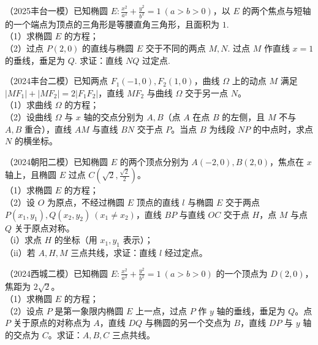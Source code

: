\begin{exercise} %
（2025丰台一模）已知椭圆 $E:\frac{x^2}{a^2}+\frac{y^2}{b^2}=1\ (a>b>0)$，以 $E$ 的两个焦点与短轴的一个端点为顶点的三角形是等腰直角三角形，且面积为 $1$.\\
（1）求椭圆 $E$ 的方程；\\
（2）过点 $P(2,0)$ 的直线与椭圆 $E$ 交于不同的两点 $M,N$. 过点 $M$ 作直线 $x=1$ 的垂线，垂足为 $Q$. 求证：直线 $NQ$ 过定点.
\end{exercise}

\begin{exercise} %
（2024丰台二模）已知两点 $F_1(-1,0),F_2(1,0)$，曲线 $\Omega$ 上的动点 $M$ 满足 $\lvert MF_1\rvert+\lvert MF_2\rvert=2\lvert F_1F_2\rvert$，直线 $MF_2$ 与曲线 $\Omega$ 交于另一点 $N$。\\
（1）求曲线 $\Omega$ 的方程；\\
（2）设曲线 $\Omega$ 与 $x$ 轴的交点分别为 $A,B$（点 $A$ 在点 $B$ 的左侧，且 $M$ 不与 $A,B$ 重合），直线 $AM$ 与直线 $BN$ 交于点 $P$。当点 $B$ 为线段 $NP$ 的中点时，求点 $N$ 的横坐标。
\end{exercise}

\begin{exercise} %
（2024朝阳二模）已知椭圆 $E$ 的两个顶点分别为 $A(-2,0),B(2,0)$，焦点在 $x$ 轴上，且椭圆 $E$ 过点 $C\left(\sqrt{2},\frac{\sqrt{2}}{2}\right)$。\\
（1）求椭圆 $E$ 的方程；\\
（2）设 $O$ 为原点，不经过椭圆 $E$ 顶点的直线 $l$ 与椭圆 $E$ 交于两点 $P(x_1,y_1),Q(x_2,y_2)\ (x_1\neq x_2)$，直线 $BP$ 与直线 $OC$ 交于点 $H$，点 $M$ 与点 $Q$ 关于原点对称。\\
（i）求点 $H$ 的坐标（用 $x_1,y_1$ 表示）；\\
（ii）若 $A,H,M$ 三点共线，求证：直线 $l$ 经过定点。
\end{exercise}

\begin{exercise} %
（2024西城二模）已知椭圆 $E:\frac{x^2}{a^2}+\frac{y^2}{b^2}=1\ (a>b>0)$ 的一个顶点为 $D(2,0)$，焦距为 $2\sqrt{2}$。\\
（1）求椭圆 $E$ 的方程；\\
（2）设点 $P$ 是第一象限内椭圆 $E$ 上一点，过点 $P$ 作 $y$ 轴的垂线，垂足为 $Q$。点 $P$ 关于原点的对称点为 $A$，直线 $DQ$ 与椭圆的另一个交点为 $B$，直线 $DP$ 与 $y$ 轴的交点为 $C$。求证：$A,B,C$ 三点共线。
\end{exercise}


